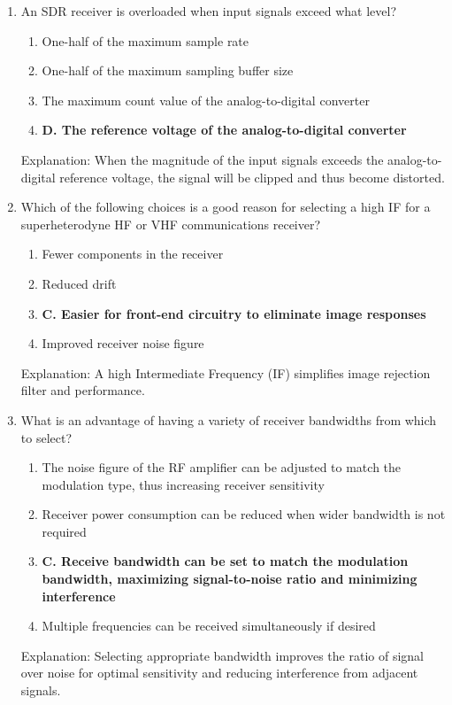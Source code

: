 \begin{enumerate}
   \item An SDR receiver is overloaded when input signals exceed what level?
        \begin{enumerate}
           \item  One-half of the maximum sample rate
           \item  One-half of the maximum sampling buffer size
       \item  The maximum count value of the analog-to-digital converter
      \item \textbf{D. The reference voltage of the analog-to-digital converter}
       \end{enumerate}
      \textcolor{myred}{Explanation:}
        When the magnitude of the input signals exceeds the analog-to-digital reference voltage, the signal will be clipped and thus become distorted.

    \item Which of the following choices is a good reason for selecting a high IF for a superheterodyne HF or VHF communications receiver?
        \begin{enumerate}
         \item  Fewer components in the receiver
      \item  Reduced drift
       \item \textbf{C. Easier for front-end circuitry to eliminate image responses}
        \item  Improved receiver noise figure
       \end{enumerate}
       \textcolor{myred}{Explanation:}
         A high Intermediate Frequency (IF) simplifies image rejection filter and performance.

     \item What is an advantage of having a variety of receiver bandwidths from which to select?
      \begin{enumerate}
        \item  The noise figure of the RF amplifier can be adjusted to match the modulation type, thus increasing receiver sensitivity
       \item  Receiver power consumption can be reduced when wider bandwidth is not required
         \item \textbf{C. Receive bandwidth can be set to match the modulation bandwidth, maximizing signal-to-noise ratio and minimizing interference}
         \item  Multiple frequencies can be received simultaneously if desired
        \end{enumerate}
          \textcolor{myred}{Explanation:}
         Selecting appropriate bandwidth improves the ratio of signal over noise for optimal sensitivity and reducing interference from adjacent signals.


\end{enumerate}
